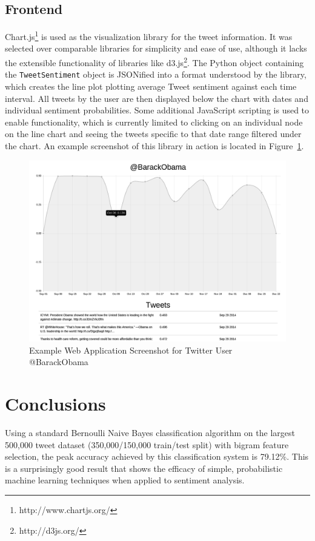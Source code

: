 \documentclass[letter,12pt]{article}
\begin{document}
\subsection{Frontend}

Chart.js\footnote{http://www.chartjs.org/} is used as the visualization library
for the tweet information. It was selected over comparable libraries for
simplicity and ease of use, although it lacks the extensible functionality of
libraries like d3.js\footnote{http://d3js.org/}. The Python object containing
the \texttt{TweetSentiment} object is JSONified into a format understood by the
library, which creates the line plot plotting average Tweet sentiment against
each time interval. All tweets by the user are then displayed below the chart
with dates and individual sentiment probabilities. Some additional JavaScript
scripting is used to enable functionality, which is currently limited to
clicking on an individual node on the line chart and seeing the tweets specific
to that date range filtered under the chart. An example screenshot of this
library in action is located in Figure~\ref{fig:obama}.

\begin{figure}[h]
  \centering
  \includegraphics[width=0.8\linewidth]{img/obama_example_usage.png}
  \caption{Example Web Application Screenshot for Twitter User @BarackObama}
  \label{fig:obama}
\end{figure}

\section{Conclusions}

Using a standard Bernoulli Naive Bayes classification algorithm on the largest
500,000 tweet dataset (350,000/150,000 train/test split) with bigram feature
selection, the peak accuracy achieved by this classification system is 79.12\%.
This is a surprisingly good result that shows the efficacy of simple,
probabilistic machine learning techniques when applied to sentiment analysis.
\end{document}
